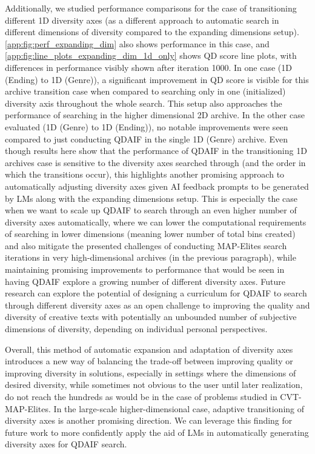 Additionally, we studied performance comparisons for the case of transitioning different 1D diversity axes (as a different approach to automatic search in different dimensions of diversity compared to the expanding dimensions setup). \cref{app:fig:perf_expanding_dim} also shows performance in this case, and \cref{app:fig:line_plots_expanding_dim_1d_only} shows QD score line plots, with differences in performance visibly shown after iteration 1000. In one case (1D (Ending) to 1D (Genre)), a significant improvement in QD score is visible for this archive transition case when compared to searching only in one (initialized) diversity axis throughout the whole search. This setup also approaches the performance of searching in the higher dimensional 2D archive. In the other case evaluated (1D (Genre) to 1D (Ending)), no notable improvements were seen compared to just conducting QDAIF in the single 1D (Genre) archive. Even though results here show that the performance of QDAIF in the transitioning 1D archives case is sensitive to the diversity axes searched through (and the order in which the transitions occur), this highlights another promising approach to automatically adjusting diversity axes given AI feedback prompts to be generated by LMs along with the expanding dimensions setup. This is especially the case when we want to scale up QDAIF to search through an even higher number of diversity axes automatically, where we can lower the computational requirements of searching in lower dimensions (meaning lower number of total bins created) and also mitigate the presented challenges of conducting MAP-Elites search iterations in very high-dimensional archives (in the previous paragraph), while maintaining promising improvements to performance that would be seen in having QDAIF explore a growing number of different diversity axes. Future research can explore the potential of designing a curriculum for QDAIF to search through different diversity axes as an open challenge to improving the quality and diversity of creative texts with potentially an unbounded number of subjective dimensions of diversity, depending on individual personal perspectives.

Overall, this method of automatic expansion and adaptation of diversity axes introduces a new way of balancing the trade-off between improving quality or improving diversity in solutions, especially in settings where the dimensions of desired diversity, while sometimes not obvious to the user until later realization, do not reach the hundreds as would be in the case of problems studied in CVT-MAP-Elites. In the large-scale higher-dimensional case, adaptive transitioning of diversity axes is another promising direction. We can leverage this finding for future work to more confidently apply the aid of LMs in automatically generating diversity axes for QDAIF search.

